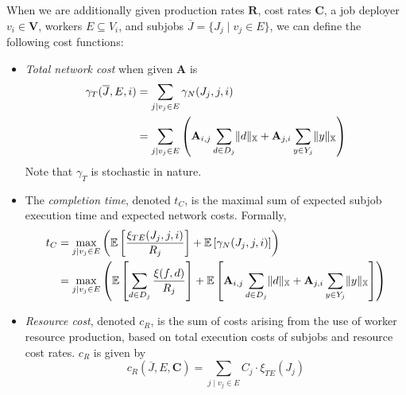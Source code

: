 \documentclass[../mthe-493-project-proposal.tex]{subfiles}
\begin{document}
    When we are additionally given production rates $\mathbf{R}$, cost rates $\mathbf{C}$, a job deployer $v_i \in \mathbf{V}$, workers $E \subseteq V_i$, and subjobs $\overline{J} = \{J_j \mid v_j \in E\}$, we can define the following cost functions:

    \begin{itemize}
        \item \textit{Total network cost} when given $\mathbf{A}$ is
              \begin{align*}
                  \gamma_T(\overline{J}, E, i) &= \sum_{j \mid v_j \in E} \gamma_N(J_j, j, i) \\
                                               &= \sum_{j \mid v_j \in E} \left(
                  \mathbf{A}_{i,j} \sum\limits_{d \in D_j} \lVert d\rVert_{\mathbb{X}} + \mathbf{A}_{j,i} \sum\limits_{y \in Y_j} \lVert y\rVert_{\mathbb{X}}
                  \right)
              \end{align*}
              Note that $\gamma_T$ is stochastic in nature.

        \item The \textit{completion time}, denoted $t_C$, is the maximal sum of expected subjob execution time and expected network costs. Formally,
              \begin{align*}
                  t_C &= \max_{j \mid v_j \in E}
                  \left(
                  \mathbb{E}\left[ \frac{\xi_{TE}(J_j, j, i)}{R_j} \right]
                  + \mathbb{E}\left[ \gamma_N(J_j, j, i) \right]
                  \right)                        \\
                      &= \max_{j \mid v_j \in E}
                  \left(
                  \mathbb{E}\left[ \sum\limits_{d \in D_j} \frac{\xi(f, d)}{R_j}\right]
                  + \mathbb{E}\left[
                      \mathbf{A}_{i,j} \sum\limits_{d \in D_j} \lVert d\rVert_{\mathbb{X}} + \mathbf{A}_{j,i} \sum\limits_{y \in Y_j} \lVert y\rVert_{\mathbb{X}}
                      \right]
                  \right)
              \end{align*}
        \item \textit{Resource cost}, denoted $c_R$, is the sum of costs arising from the use of worker resource production, based on total execution costs of subjobs and resource cost rates. $c_R$ is given by
              \begin{equation*}
                  c_R(\overline{J}, E, \mathbf{C}) = \sum_{j \mid v_j \in E} C_j \cdot \xi_{TE}(J_j)
              \end{equation*}
    \end{itemize}
\end{document}
